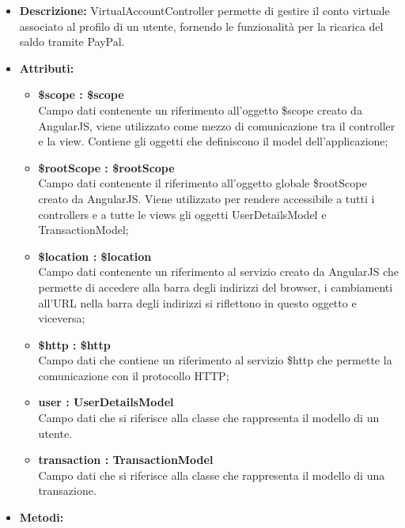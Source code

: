 \begin{itemize}
	\item \textbf{Descrizione:} VirtualAccountController permette di gestire il conto virtuale associato
al profilo di un utente, fornendo le funzionalità per la ricarica del saldo tramite PayPal.
	\item \textbf{Attributi:}
		\begin{itemize}
		
			\item \textbf{\$scope : \$scope}\\
			Campo dati contenente un riferimento all'oggetto \$scope creato da AngularJS, viene utilizzato come mezzo di comunicazione tra il controller e la view. Contiene gli oggetti che definiscono il model dell'applicazione;
			
			\item \textbf{\$rootScope : \$rootScope}\\
			Campo dati contenente il riferimento all'oggetto globale \$rootScope creato da AngularJS. Viene utilizzato per rendere accessibile a tutti i controllers e a tutte le views gli oggetti UserDetailsModel e TransactionModel;
			
			\item \textbf{\$location : \$location}\\
			Campo dati contenente un riferimento al servizio creato da AngularJS che permette di accedere alla barra degli indirizzi del browser, i cambiamenti all'URL nella barra degli indirizzi si riflettono in questo oggetto e viceversa;

			\item \textbf{\$http : \$http }\\
			Campo dati che contiene un riferimento al servizio \$http che permette la comunicazione con il protocollo HTTP;
				
			\item \textbf{user : UserDetailsModel }\\
			Campo dati che si riferisce alla classe che rappresenta il modello di un utente.
			
			\item \textbf{transaction : TransactionModel }\\
			Campo dati che si riferisce alla classe che rappresenta il modello di una transazione.
				
		\end{itemize}
	\item \textbf{Metodi:}
		\begin{itemize}
		

\end{itemize}
\end{itemize}
